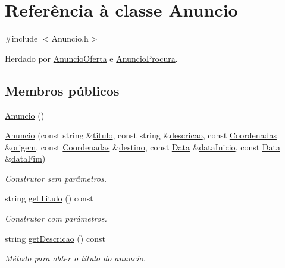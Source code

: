 \hypertarget{class_anuncio}{\section{Referência à classe Anuncio}
\label{class_anuncio}
}


{\ttfamily \#include $<$Anuncio.\+h$>$}



Herdado por \hyperlink{class_anuncio_oferta}{Anuncio\+Oferta} e \hyperlink{class_anuncio_procura}{Anuncio\+Procura}.

\subsection*{Membros públicos}
\begin{DoxyCompactItemize}
\item 
\hyperlink{class_anuncio_a97da342f390c8ee647d60cf29a923667}{Anuncio} ()
\item 
\hyperlink{class_anuncio_ad0adf24f36f64c2c786871e8f29ad8b5}{Anuncio} (const string \&\hyperlink{class_anuncio_adb34bedd8220f42b9ee37662c21313e6}{titulo}, const string \&\hyperlink{class_anuncio_aa6a9eb8d08cb06d16061b006eb2c8b97}{descricao}, const \hyperlink{class_coordenadas}{Coordenadas} \&\hyperlink{class_anuncio_a9b3f8ac29ebf2a44e24ea2273064a7f5}{origem}, const \hyperlink{class_coordenadas}{Coordenadas} \&\hyperlink{class_anuncio_acdac86595f84cfb8a2bf54c414857168}{destino}, const \hyperlink{class_data}{Data} \&\hyperlink{class_anuncio_abeb7d8c5fe5e7d127005044981a3cd3d}{data\+Inicio}, const \hyperlink{class_data}{Data} \&\hyperlink{class_anuncio_ac3b9182cc541cb68215f8aa09fb0e11a}{data\+Fim})
\begin{DoxyCompactList}\small\item\em Construtor sem parâmetros. \end{DoxyCompactList}\item 
string \hyperlink{class_anuncio_af712423e3645f7127f987d88793127d4}{get\+Titulo} () const 
\begin{DoxyCompactList}\small\item\em Construtor com parâmetros. \end{DoxyCompactList}\item 
string \hyperlink{class_anuncio_a693f59391a620851b4ac37063e8f4af4}{get\+Descricao} () const 
\begin{DoxyCompactList}\small\item\em Método para obter o titulo do anuncio. \end{DoxyCompactList}\item 

\end{DoxyCompactItemize}
